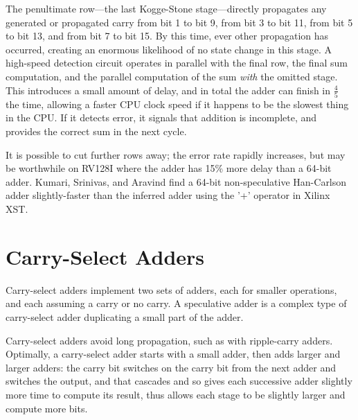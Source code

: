 The penultimate row—the last Kogge-Stone stage—directly propagates any generated or propagated carry from bit 1 to bit 9, from bit 3 to bit 11, from bit 5 to bit 13, and from bit 7 to bit 15.  By this time, ever other propagation has occurred, creating an enormous likelihood of no state change in this stage.  A high-speed detection circuit operates in parallel with the final row, the final sum computation, and the parallel computation of the sum \textit{with} the omitted stage.  This introduces a small amount of delay, and in total the adder can finish in $\frac{4}{5}$ the time, allowing a faster CPU clock speed if it happens to be the slowest thing in the CPU.  If it detects error, it signals that addition is incomplete, and provides the correct sum in the next cycle.

It is possible to cut further rows away; the error rate rapidly increases, but may be worthwhile on RV128I where the adder has 15\% more delay than a 64-bit adder.  Kumari, Srinivas, and Aravind find a 64-bit non-speculative Han-Carlson adder slightly-faster than the inferred adder using the '+' operator in Xilinx XST.

\section{Carry-Select Adders}

Carry-select adders implement two sets of adders, each for smaller operations, and each assuming a carry or no carry.  A speculative adder is a complex type of carry-select adder duplicating a small part of the adder.

Carry-select adders avoid long propagation, such as with ripple-carry adders.  Optimally, a carry-select adder starts with a small adder, then adds larger and larger adders:  the carry bit switches on the carry bit from the next adder and switches the output, and that cascades and so gives each successive adder slightly more time to compute its result, thus allows each stage to be slightly larger and compute more bits.